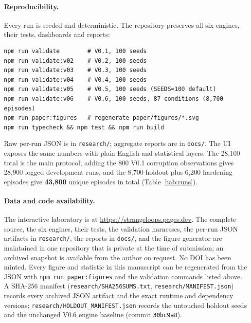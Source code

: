 \documentclass[11pt,a4paper]{article}
\begin{document}
\paragraph{Reproducibility.}
Every run is seeded and deterministic. The repository preserves all six engines, their tests, dashboards and reports:
\begin{verbatim}
npm run validate        # V0.1, 100 seeds
npm run validate:v02    # V0.2, 100 seeds
npm run validate:v03    # V0.3, 100 seeds
npm run validate:v04    # V0.4, 100 seeds
npm run validate:v05    # V0.5, 100 seeds (SEEDS=100 default)
npm run validate:v06    # V0.6, 100 seeds, 87 conditions (8,700 episodes)
npm run paper:figures   # regenerate paper/figures/*.svg
npm run typecheck && npm test && npm run build
\end{verbatim}
Raw per-run JSON is in \texttt{research/}; aggregate reports are in \texttt{docs/}. The UI exposes the same numbers with plain-English and statistical layers. The 28{,}100 total is the main protocol; adding the 800 V0.1 corruption observations gives 28{,}900 logged development runs, and the 8{,}700 holdout plus 6{,}200 hardening episodes give \textbf{43{,}800} unique episodes in total (Table~\ref{tab:runs}).

\paragraph{Data and code availability.}
The interactive laboratory is at \url{https://strangeloops.pages.dev}. The complete source, the six engines, their tests, the validation harnesses, the per-run JSON artifacts in \texttt{research/}, the reports in \texttt{docs/}, and the figure generator are maintained in one repository that is private at the time of submission; an archived snapshot is available from the author on request. No DOI has been minted. Every figure and statistic in this manuscript can be regenerated from the JSON with \texttt{npm run paper:figures} and the validation commands listed above. A SHA-256 manifest (\texttt{research/SHA256SUMS.txt}, \texttt{research/MANIFEST.json}) records every archived JSON artifact and the exact runtime and dependency versions; \texttt{research/HOLDOUT\_MANIFEST.json} records the untouched holdout seeds and the unchanged V0.6 engine baseline (commit \texttt{30bc9a8}).
\end{document}
